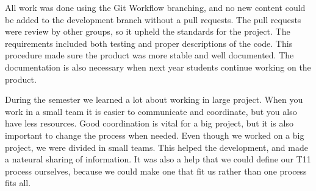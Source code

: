 All work was done using the Git Workflow branching, and no new content could be added to the development branch without a pull requests. The pull requests were review by other groups, so it upheld the standards for the project. The requirements included both testing and proper descriptions of the code. This procedure made sure the product was more stable and well documented. The documentation is also necessary when next year students continue working on the product. 

During the semester we learned a lot about working in large project. When you work in a small team it is easier to communicate and coordinate, but you also have less resources. Good coordination is vital for a big project, but it is also important to change the process when needed. Even though we worked on a big project, we were divided in small teams. This helped the development, and made a nateural sharing of information. It was also a help that we could define our \gls{T11} process ourselves, because we could make one that fit us rather than one process fits all. 
